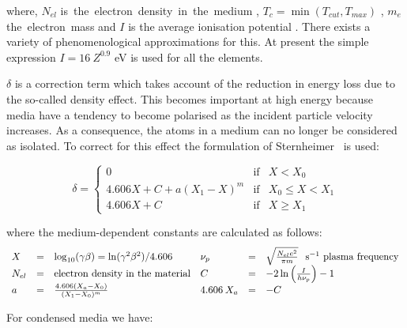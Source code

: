 where,
$ N_{el}$ \mbox{is the electron density in the medium} ,
$T _c = \min(T_{cut},T_{max})$ , $m_e$ \mbox{the electron mass}
and $I$ is the average ionisation potential .
There exists a variety of phenomenological approximations for this.
 At present the simple expression  $I=16\:Z^{0.9}$ eV is used for all the 
elements.

$\delta$ is a correction term which takes account of the reduction
in energy loss due to the so-called density effect. This becomes
important at high energy because media have a tendency to become
polarised as the incident particle velocity increases. As a consequence,
the atoms in a medium can no longer be considered as isolated. To correct
for this effect the formulation of Sternheimer~\cite{hion.sternheimer}
is used:

\begin{equation}
\label{muion.d}
\delta = \left \{ \begin{array}{lll}
            0                   &    \mbox{if} & X  < X_0      \\
            4.606X + C + a(X_1-X)^m & \mbox{if} & X_0 \leq X < X_1 \\
            4.606X + C  & \mbox{if}  & X  \geq X_1
            \end{array} \right .
\end{equation}

where the medium-dependent constants are calculated as follows:
\[
\begin{array}{lcllcl}
X & = & \log_{10}(\gamma \beta) = \ln(\gamma^{2} \beta^{2})/4.606 &
\nu_{p} & = & \sqrt{ \frac{N_{el} e^2 }{\pi m} }
\mbox{\hspace{0.25cm}s$^{-1}$ plasma frequency} \\
N_{el} & = & \mbox{electron density in the material}
& C & = & -2 \ln \left ( \frac{I}{h\nu_{p}} \right ) - 1 \\
a & = & \frac{4.606(X_a - X_0)}{(X_1 - X_0)^m} & 4.606 \: X_{a} & = & -C
\end{array}
\]

For condensed media we have:

